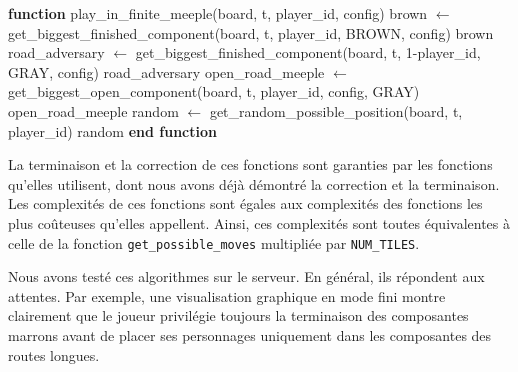 \documentclass[10pt]{article}
\begin{document}
\begin{algorithm}[H]
\caption{play\_in\_finite\_meeple}
\begin{algorithmic}[1]
\STATE \textbf{function} play\_in\_finite\_meeple(board, t, player\_id, config)
    \STATE brown $\gets$ get\_biggest\_finished\_component(board, t, player\_id, BROWN, config)
        \RETURN brown
    \ENDIF
        \STATE road\_adversary $\gets$ get\_biggest\_finished\_component(board, t, 1-player\_id, GRAY, config)
            \RETURN road\_adversary
        \ENDIF
    \ELSE
        \STATE open\_road\_meeple $\gets$ get\_biggest\_open\_component(board, t, player\_id, config, GRAY)
            \RETURN open\_road\_meeple
        \ENDIF
    \ENDIF
    \STATE random $\gets$ get\_random\_possible\_position(board, t, player\_id)
    \RETURN random
\STATE \textbf{end function}
\end{algorithmic}
\end{algorithm}

La terminaison et la correction de ces fonctions sont garanties par les fonctions qu'elles utilisent, dont nous avons déjà démontré la correction et la terminaison. Les complexités de ces fonctions sont égales aux complexités des fonctions les plus coûteuses qu'elles appellent. Ainsi, ces complexités sont toutes équivalentes à celle de la fonction \texttt{get\_possible\_moves} multipliée par \texttt{NUM\_TILES}.

Nous avons testé ces algorithmes sur le serveur. En général, ils répondent aux attentes. Par exemple, une visualisation graphique en mode fini montre clairement que le joueur privilégie toujours la terminaison des composantes marrons avant de placer ses personnages uniquement dans les composantes des routes longues.
\end{document}
